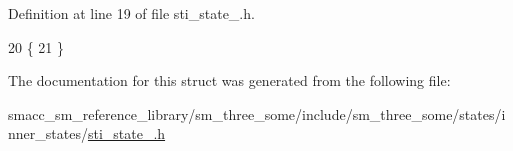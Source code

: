 Definition at line 19 of file sti\+\_\+state\+\_.\+h.


\begin{DoxyCode}
20   \{
21   \}
\end{DoxyCode}


The documentation for this struct was generated from the following file\+:\begin{DoxyCompactItemize}
\item 
smacc\+\_\+sm\+\_\+reference\+\_\+library/sm\+\_\+three\+\_\+some/include/sm\+\_\+three\+\_\+some/states/inner\+\_\+states/\hyperlink{sti__state__1_8h}{sti\+\_\+state\+\_.\+h}\end{DoxyCompactItemize}
